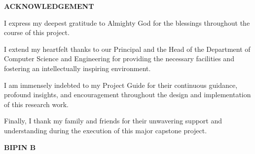 \clearpage
\begin{center}
    {\Large \textbf{ACKNOWLEDGEMENT}\par}
\end{center}
\vspace{1.0cm}

I express my deepest gratitude to Almighty God for the blessings throughout the course of this project.

I extend my heartfelt thanks to our Principal and the Head of the Department of Computer Science and Engineering for providing the necessary facilities and fostering an intellectually inspiring environment.

I am immensely indebted to my Project Guide for their continuous guidance, profound insights, and encouragement throughout the design and implementation of this research work.

Finally, I thank my family and friends for their unwavering support and understanding during the execution of this major capstone project.

\vspace{1.5cm}
\noindent \textbf{BIPIN B}

\clearpage
